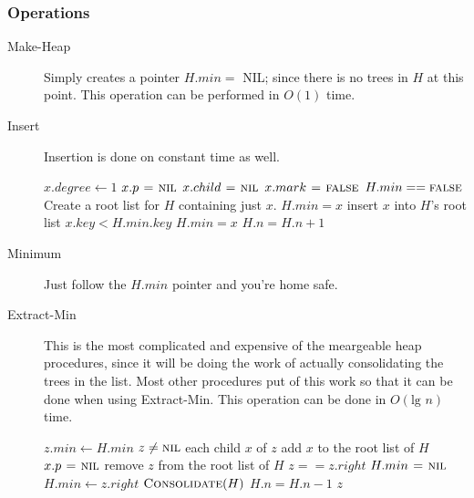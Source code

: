 \subsubsection{Operations}

\begin{description}
\item[Make-Heap] Simply creates a pointer $H.min =$ NIL; since there is no trees
  in $H$ at this point. This operation can be performed in $O(1)$ time.

\item[Insert] Insertion is done on constant time as well.
  \begin{codebox}
    \li $x.degree \gets 1$
    \li $x.p \mathrel{\hspace{1pt}=\hspace{1pt}} \textnormal{\scshape nil}$
    \li $x.child \mathrel{\hspace{1pt}=\hspace{1pt}} \textnormal{\scshape nil}$
    \li $x.mark \mathrel{\hspace{1pt}=\hspace{1pt}} \textnormal{\scshape false}$
    \li \If $H.min == \textnormal{\scshape false}$ \Do
    \li   Create a root list for $H$ containing just $x$.
    \li   $H.min = x$
    \li \Else insert $x$ into $H$'s root list
    \li   \If $x.key < H.min.key$ \Do
    \li     $H.min = x$
          \End
        \End
    \li $H.n = H.n + 1$

  \end{codebox}

\item[Minimum] Just follow the $H.min$ pointer and you're home safe.

\item[Extract-Min] This is the most complicated and expensive of the meargeable
  heap procedures, since it will be doing the work of actually consolidating the
  trees in the list. Most other procedures put of this work so that it can be
  done when using Extract-Min. This operation can be done in $O(\text{lg }n)$
  time.
  \begin{codebox}
    \li $z.min \gets H.min$
    \li \If $z \neq \textnormal{\scshape nil}$ \Do
    \li   \For each child $x$ of $z$ \Do
    \li     add $x$ to the root list of $H$
    \li     $x.p \mathrel{\hspace{1pt}=\hspace{1pt}} \textnormal{\scshape nil}$ \End
    \li   remove $z$ from the root list of $H$
    \li   \If $z == z.right$ \Do
    \li     $H.min \mathrel{\hspace{1pt}=\hspace{1pt}} \textnormal{\scshape nil}$
    \li   \Else $H.min \gets z.right$
    \li     $\textnormal{\scshape Consolidate}(H)$ \End
    \li   $H.n = H.n - 1$ \End
    \li \Return $z$
  \end{codebox}


\end{description}
